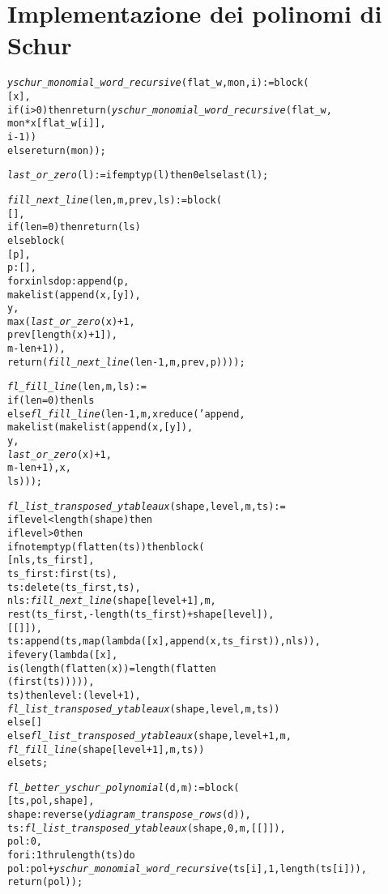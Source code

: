 \section{Implementazione dei polinomi di Schur}

\begin{alltt}
\emph{yschur\_monomial\_word\_recursive} (flat\_w, mon, i) := block (
  [x],
  if (i>0) then return (\emph{yschur\_monomial\_word\_recursive} (flat\_w,
                                                        mon*x[flat\_w[i]],
                                                        i-1))
  else return (mon));

\emph{last\_or\_zero} (l) := if emptyp (l) then 0 else last(l);


\emph{fill\_next\_line} (len, m, prev, ls) := block (
  [],
  if (len = 0) then return (ls)
  else block (
    [p],
    p : [],
    for x in ls do p : append (p,
                               makelist (append (x, [y]),
                               y,
                               max (\emph{last\_or\_zero} (x) + 1,
                                    prev[length (x)+1]),
                               m - len + 1)),
    return (\emph{fill\_next\_line} (len - 1, m, prev, p))));


\emph{fl\_fill\_line} (len, m, ls) :=
if (len=0) then ls
else \emph{fl\_fill\_line} (len-1, m, xreduce ('append, 
                                       makelist (makelist (append (x, [y]),
                                                 y,
                                                 \emph{last\_or\_zero} (x) + 1,
                                                 m - len +1), x,
                                                 ls)));

\emph{fl\_list\_transposed\_ytableaux} (shape, level, m, ts) :=
if level < length (shape) then
  if level > 0 then
    if not emptyp (flatten (ts)) then block (
      [nls,ts\_first],
      ts\_first : first (ts),
      ts : delete (ts\_first, ts),
      nls : \emph{fill\_next\_line} (shape [level+1], m,
                            rest (ts\_first, -length(ts\_first)+shape[level]),
                            [[]]),
      ts : append (ts, map (lambda ([x], append (x, ts\_first)), nls)),
      if every (lambda ([x],
                        is (length (flatten (x)) = length (flatten
                        (first (ts))))),
                ts) then level : (level + 1),
      \emph{fl\_list\_transposed\_ytableaux} (shape, level, m, ts))
    else []
  else \emph{fl\_list\_transposed\_ytableaux} (shape, level + 1, m,
                                     \emph{fl\_fill\_line} (shape[level + 1], m, ts))
else ts;

\emph{fl\_better\_yschur\_polynomial} (d, m) := block (
  [ts, pol, shape],
  shape : reverse (\emph{ydiagram\_transpose\_rows} (d)),
  ts : \emph{fl\_list\_transposed\_ytableaux} (shape, 0, m, [[]]),
  pol : 0,
  for i : 1 thru length (ts) do
    pol : pol + \emph{yschur\_monomial\_word\_recursive} (ts[i], 1, length (ts[i])),
  return (pol));
\end{alltt}

